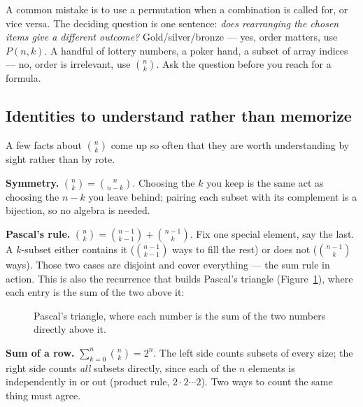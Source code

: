 \begin{trapbox}
A common mistake is to use a permutation when a combination is
called for, or vice versa. The deciding question is one sentence: \emph{does
rearranging the chosen items give a different outcome?} Gold/silver/bronze --- yes,
order matters, use $P(n,k)$. A handful of lottery numbers, a poker hand, a subset of
array indices --- no, order is irrelevant, use $\binom{n}{k}$. Ask the question
before you reach for a formula.
\end{trapbox}

\subsection{Identities to understand rather than memorize}

A few facts about $\binom{n}{k}$ come up so often that they are worth understanding by
sight rather than by rote.

\textbf{Symmetry.} $\displaystyle \binom{n}{k} = \binom{n}{n-k}$. Choosing the $k$ you
keep is the same act as choosing the $n-k$ you leave behind; pairing each
subset with its complement is a bijection, so no algebra is needed.

\textbf{Pascal's rule.} $\displaystyle \binom{n}{k} = \binom{n-1}{k-1} +
\binom{n-1}{k}$. Fix one special element, say the last. A $k$-subset either contains
it ($\binom{n-1}{k-1}$ ways to fill the rest) or does not ($\binom{n-1}{k}$ ways).
Those two cases are disjoint and cover everything --- the sum rule in action. This is
also the recurrence that builds Pascal's triangle (Figure~\ref{fig:pascal}), where each entry is the sum of the
two above it:

\begin{figure}[htbp]
\centering
{}
\caption{Pascal's triangle, where each number is the sum of the two numbers directly above it.}
\label{fig:pascal}
\end{figure}

\textbf{Sum of a row.} $\displaystyle \sum_{k=0}^{n} \binom{n}{k} = 2^n$. The left
side counts subsets of every size; the right side counts \emph{all} subsets directly,
since each of the $n$ elements is independently in or out (product rule,
$2 \cdot 2 \cdots 2$). Two ways to count the same thing must agree.

